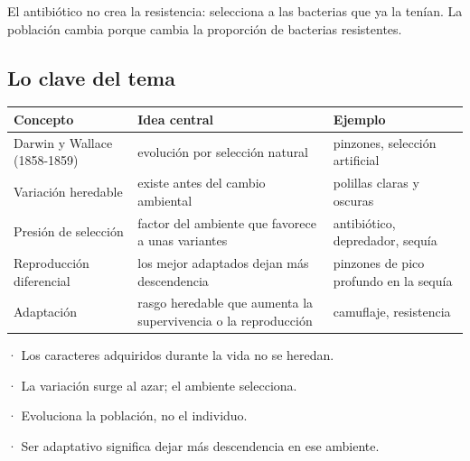 \begin{clave}[{Recuerda}] El antibiótico no crea la resistencia: selecciona a las bacterias que ya la tenían. La población cambia porque cambia la proporción de bacterias resistentes.\end{clave}
\subsection{Lo clave del tema}
\begin{center}\small
\begin{tabularx}{\linewidth}{@{}>{\raggedright\arraybackslash\hsize=0.79\hsize}X>{\raggedright\arraybackslash\hsize=1.13\hsize}X>{\raggedright\arraybackslash\hsize=1.08\hsize}X@{}}
\toprule
\textbf{Concepto} & \textbf{Idea central} & \textbf{Ejemplo} \\
\midrule
Darwin y Wallace (1858-1859) & evolución por selección natural & pinzones, selección artificial \\
Variación heredable & existe antes del cambio ambiental & polillas claras y oscuras \\
Presión de selección & factor del ambiente que favorece a unas variantes & antibiótico, depredador, sequía \\
Reproducción diferencial & los mejor adaptados dejan más descendencia & pinzones de pico profundo en la sequía \\
Adaptación & rasgo heredable que aumenta la supervivencia o la reproducción & camuflaje, resistencia \\
\bottomrule
\end{tabularx}
\end{center}
 
\begin{clave}[{Recuerda}] · Los caracteres adquiridos durante la vida no se heredan.\par · La variación surge al azar; el ambiente selecciona.\par · Evoluciona la población, no el individuo.\par · Ser adaptativo significa dejar más descendencia en ese ambiente.\end{clave}
 
